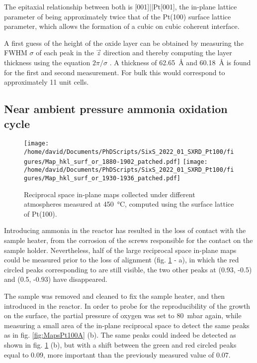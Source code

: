 The epitaxial relationship between both is [001]||Pt[001], the in-plane lattice parameter of  being approximately twice that of the Pt(100) surface lattice parameter, which allows the formation of a cubic on cubic coherent interface.

A first guess of the height of the oxide layer can be obtained by measuring the FWHM $\sigma$ of each peak in the $\vec{z}$ direction and thereby computing the layer thickness using the equation $2\pi/\sigma$ \parencite{Warren1990}.
A thickness of \qty{62.65}{\angstrom} and \qty{60.18}{\angstrom} is found for the first and second measurement.
For bulk  this would correspond to approximately 11 unit cells.

\subsection{Near ambient pressure ammonia oxidation cycle}

\begin{figure}[!htb]
    \centering
    \texttt{[image: /home/david/Documents/PhDScripts/SixS\_2022\_01\_SXRD\_Pt100/figures/Map\_hkl\_surf\_or\_1880-1902\_patched.pdf]}
    \texttt{[image: /home/david/Documents/PhDScripts/SixS\_2022\_01\_SXRD\_Pt100/figures/Map\_hkl\_surf\_or\_1930-1936\_patched.pdf]}
    \caption{
        Reciprocal space in-plane maps collected under different atmospheres measured at \qty{450}{\degreeCelsius}, computed using the surface lattice of Pt(100).
    }
    \label{fig:MapsPt100B}
\end{figure}

Introducing ammonia in the reactor has resulted in the loss of contact with the sample heater, from the corrosion of the screws responsible for the contact on the sample holder.
Nevertheless, half of the large reciprocal space in-plane maps could be measured prior to the loss of alignment (fig. \ref{fig:MapsPt100B} - a), in which the red circled peaks corresponding to  are still visible, the two other peaks at (0.93, -0.5) and (0.5, -0.93) have disappeared.

The sample was removed and cleaned to fix the sample heater, and then introduced in the reactor.
In order to probe for the reproducibility of the  growth on the surface, the partial pressure of oxygen was set to \qty{80}{\milli\bar} again, while measuring a small area of the in-plane reciprocal space to detect the same peaks as in fig. \ref{fig:MapsPt100A} (b).
The same peaks could indeed be detected as shown in fig. \ref{fig:MapsPt100B} (b), but with a shift between the green and red circled peaks equal to $0.09$, more important than the previously measured value of $0.07$.

